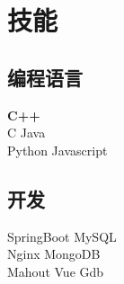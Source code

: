 \documentclass[]{deedy-resume-openfont}
\begin{document}
\begin{minipage}[t]{0.25\textwidth}
\section{技能}
\sectionsep
\subsection{编程语言}
\textbf{C++} \\
C \textbullet{} Java \\
Python \textbullet{} Javascript \\ 
\sectionsep

\subsection{开发}
SpringBoot  \textbullet{} MySQL \\
Nginx \textbullet{} MongoDB \textbullet{} \\
Mahout \textbullet{} Vue \textbullet{} Gdb\\


%
%

\end{minipage} 
\hfill
\end{document}

